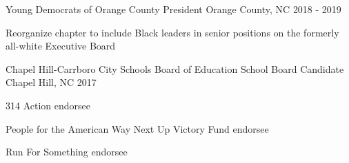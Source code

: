 \begin{cventries}
  \cventry
    {Young Democrats of Orange County} %
    {President} %
    {Orange County, NC} %
    {2018 - 2019} %
    {
      \begin{cvitems} %
        \item {Reorganize chapter to include Black leaders in senior positions on the formerly all-white Executive Board}
      \end{cvitems}
    }	

  \cventry
    {Chapel Hill-Carrboro City Schools Board of Education} %
    {School Board Candidate} %
    {Chapel Hill, NC} %
    {2017} %
    {
      \begin{cvitems} %
        \item {314 Action endorsee}
        \item {People for the American Way Next Up Victory Fund endorsee}
        \item {Run For Something endorsee}
      \end{cvitems}
    }

\end{cventries}